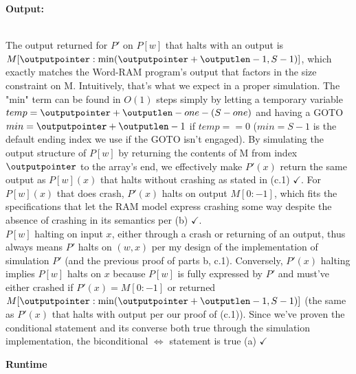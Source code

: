 \documentclass[11pt]{article}
\begin{document}
\begin{enumerate}
\begin{center}
\textbf{    Output:}
\end{center} \\

The output returned for $P'$ on $P[w]$ that halts with an output is $M[\outputpointer : \min(\outputpointer + \outputlen - 1, S-1)]$, which exactly matches the Word-RAM program's output that factors in the size constraint on M. Intuitively, that's what we expect in a proper simulation. The "min" term can be found in $O(1)$ steps simply by letting a temporary variable $temp = \outputpointer + \outputlen - one - (S - one)$ and having a GOTO $min = \outputpointer + \outputlen -1$ if $temp == 0$ ($min = S - 1$ is the default ending index we use if the GOTO isn't engaged). By simulating the output structure of $P[w]$ by returning the contents of M from index $\outputpointer$ to the array's end, we effectively make $P'(x)$ return the same output as $P[w](x)$ that halts without crashing as stated in (c.1) $\checkmark$. For $P[w](x)$ that does crash, $P'(x)$ halts on output $M[0:-1]$, which fits the specifications that let the RAM model express crashing some way despite the absence of crashing in its semantics per (b) $\checkmark$. \\ 

$P[w]$ halting on input $x$, either through a crash or returning of an output, thus always means $P'$ halts on $(w, x)$ per my design of the implementation of simulation $P'$ (and the previous proof of parts b, c.1). Conversely, $P'(x)$ halting implies $P[w]$ halts on $x$ because $P[w]$ is fully expressed by $P'$ and must've either crashed if $P'(x) = M[0:-1]$ or returned $M[\outputpointer : \min(\outputpointer + \outputlen - 1, S-1)]$ (the same as $P'(x)$ that halts with output per our proof of (c.1)). Since we've proven the conditional statement and its converse both true through the simulation implementation, the biconditional $\Leftrightarrow$ statement is true (a) $\checkmark$ \\

\begin{center}
\textbf{    Runtime}
\end{center} \\


\end{enumerate}
\end{document}
